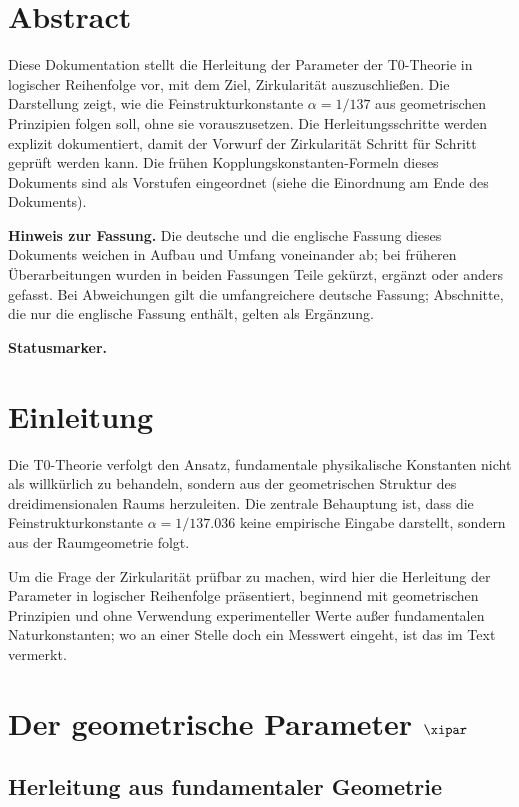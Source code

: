 \hfuzz=10pt
\section*{Abstract}
		Diese Dokumentation stellt die Herleitung der Parameter der T0-Theorie in logischer Reihenfolge vor, mit dem Ziel, Zirkularität auszuschließen. Die Darstellung zeigt, wie die Feinstrukturkonstante $\alpha = 1/137$ aus geometrischen Prinzipien folgen soll, ohne sie vorauszusetzen. Die Herleitungsschritte werden explizit dokumentiert, damit der Vorwurf der Zirkularität Schritt für Schritt geprüft werden kann. Die frühen Kopplungskonstanten-Formeln dieses Dokuments sind als Vorstufen eingeordnet (siehe die Einordnung am Ende des Dokuments).

	\medskip\noindent\textbf{Hinweis zur Fassung.} Die deutsche und die englische Fassung dieses Dokuments weichen in Aufbau und Umfang voneinander ab; bei früheren Überarbeitungen wurden in beiden Fassungen Teile gekürzt, ergänzt oder anders gefasst. Bei Abweichungen gilt die umfangreichere deutsche Fassung; Abschnitte, die nur die englische Fassung enthält, gelten als Ergänzung.


\medskip\noindent\textbf{Statusmarker.}


	
	\section{Einleitung}
	
	Die T0-Theorie verfolgt den Ansatz, fundamentale physikalische Konstanten nicht als willkürlich zu behandeln, sondern aus der geometrischen Struktur des dreidimensionalen Raums herzuleiten. Die zentrale Behauptung ist, dass die Feinstrukturkonstante $\alpha = 1/137.036$ keine empirische Eingabe darstellt, sondern aus der Raumgeometrie folgt.
	
	Um die Frage der Zirkularität prüfbar zu machen, wird hier die Herleitung der Parameter in logischer Reihenfolge präsentiert, beginnend mit geometrischen Prinzipien und ohne Verwendung experimenteller Werte außer fundamentalen Naturkonstanten; wo an einer Stelle doch ein Messwert eingeht, ist das im Text vermerkt.
\section{Der geometrische Parameter $\xipar$}

\subsection{Herleitung aus fundamentaler Geometrie}

